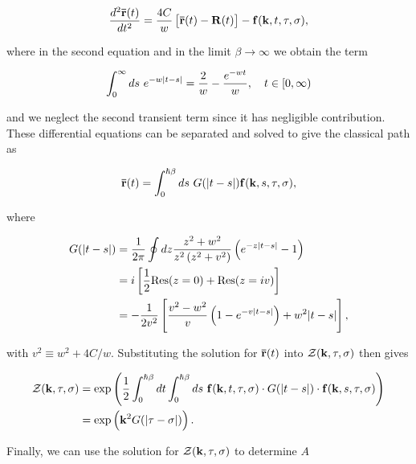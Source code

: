 \begin{equation}
    \frac{d^2 \vb{\bar{r}}(t)}{dt^2} = \frac{4C}{w} \left[\vb{\bar{r}}(t) - \vb{R}(t)\right] - \vb{f}(\vb{k}, t, \tau, \sigma) ,
\end{equation}

where in the second equation and in the limit $\beta \to \infty$ we obtain the term

\begin{equation}
    \int^\infty_0 ds\ e^{-w\abs{t-s}} = \frac{2}{w} - \frac{e^{-wt}}{w}, \quad t \in [0, \infty)
\end{equation}

and we neglect the second transient term since it has negligible contribution. These differential equations can be separated and solved to give the classical path as

\begin{equation}
    \vb{\bar{r}}(t) = \int^{\hslash\beta}_0 ds\ G(\abs{t-s}) \vb{f}(\vb{k}, s, \tau, \sigma),
\end{equation}

where

\begin{equation}
\begin{aligned}
    G(\abs{t-s}) &= \frac{1}{2\pi} \oint dz \frac{z^2 + w^2}{z^2 \left(z^2 + v^2\right)} \left(e^{-z\abs{t-s}}-1\right) \\
    &= i \left[\frac{1}{2} \mathrm{Res}(z=0) + \mathrm{Res}(z = iv) \right] \\
    &= -\frac{1}{2v^2} \left[ \frac{v^2-w^2}{v}\left(1 - e^{-v\abs{t-s}}\right) + w^2 \abs{t-s} \right],
\end{aligned}
\end{equation}

with $v^2 \equiv w^2 + 4C/w$. Substituting the solution for $\vb{\bar{r}}(t)$ into $\mathcal{Z}(\vb{k}, \tau, \sigma)$ then gives

\begin{equation}
    \begin{aligned}
        \mathcal{Z}(\vb{k}, \tau, \sigma) &= \exp\left( \frac{1}{2} \int^{\hslash\beta}_0 dt \int^{\hslash\beta}_0 ds\ \vb{f}(\vb{k}, t, \tau, \sigma) \cdot  G(\abs{t-s}) \cdot \vb{f}(\vb{k}, s, \tau, \sigma) \right) \\
        &= \exp \left( \vb{k}^2 G(\abs{\tau - \sigma}) \right).
    \end{aligned}
\end{equation}

Finally, we can use the solution for $\mathcal{Z}(\vb{k}, \tau, \sigma)$ to determine $A$

